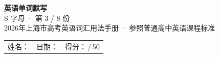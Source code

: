 \documentclass[10pt,a4paper]{article}
\begin{document}
\pagestyle{plain}

\begin{center}
{\LARGE\bfseries 英语单词默写}\\[0.22em]
{\large S 字母 · 第 3 / 8 份}\\[0.18em]
{\small 2026年上海市高考英语词汇用法手册 · 参照普通高中英语课程标准}
\end{center}

\vspace{0.25em}
\noindent\begin{tabular}{@{}p{}@{}p{}@{}p{}@{}}
姓名：\underline{\hspace{2.0cm}} & 日期：\underline{\hspace{2.0cm}} & 得分：\underline{\hspace{1.3cm}}\,/\,50 \\
\end{tabular}

\vspace{0.3em}

\vspace{0.08em}
\end{document}
